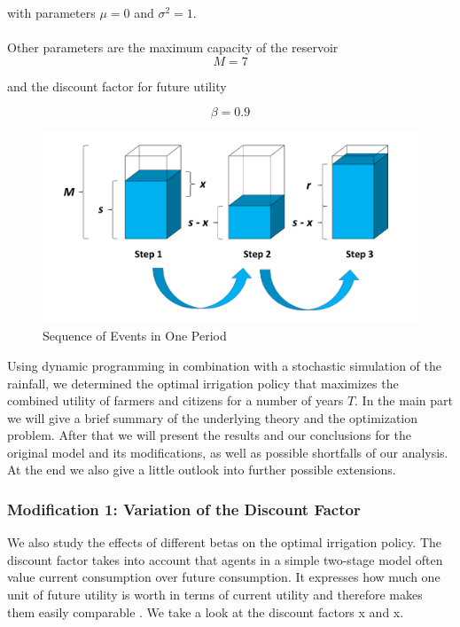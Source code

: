 \documentclass[12pt, a4paper, oneside]{article}
\begin{document}
with parameters $\mu = 0$ and $\sigma^2 = 1$.\\\\

Other parameters are the maximum capacity of the reservoir
\begin{equation}
	M = 7
\end{equation}

and the discount factor for future utility 

\begin{equation}
	\beta = 0.9
\end{equation}

\begin{figure}[ht]
	\includegraphics[width=1\textwidth]{figures/CESchaubild_Cut.png}
	\caption{Sequence of Events in One Period}
	\label{fig:Sequence}
\end{figure}

Using dynamic programming in combination with a stochastic simulation of the rainfall, we determined the optimal irrigation policy that maximizes the combined utility of farmers and citizens for a number of years $T$.
In the main part we will give a brief summary of the underlying theory and the optimization problem.
After that we will present the results and our conclusions for the original model and its modifications, as well as possible shortfalls of our analysis.
At the end we also give a little outlook into further possible extensions.


\subsubsection{Modification 1: Variation of the Discount Factor}
We also study the effects of different betas on the optimal irrigation policy. 
The discount factor takes into account that agents in a simple two-stage model often value current consumption over future consumption.
It expresses how much one unit of future utility is worth in terms of current utility and therefore makes them easily comparable \citep{kruschwitz2014investitionsrechnung}.
We take a look at the discount factors x and x.
\end{document}
